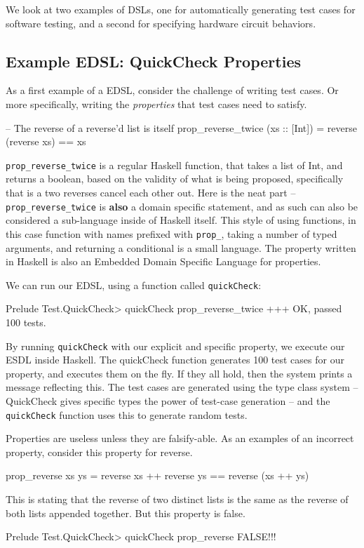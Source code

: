 \documentclass[11pt]{article}
\begin{document}
We look at two examples of DSLs, one for automatically generating test cases for software testing,
and a second for specifying hardware circuit behaviors.

\subsection{Example EDSL: QuickCheck Properties}

As a first example of a EDSL, consider the challenge of writing test cases.
Or more specifically, writing the {\em properties\/} that test cases need to satisfy.

\begin{Code}
-- The reverse of a reverse'd list is itself
prop_reverse_twice (xs :: [Int]) = reverse (reverse xs) == xs
\end{Code}

\verb|prop_reverse_twice| is a regular Haskell function,
that takes a list of Int, and returns a boolean, based
on the validity of what is being proposed, specifically
that is a two reverses cancel each other out. 
Here is the neat part -- \verb|prop_reverse_twice| is {\bf also\/} a
domain specific statement, and as such can also be considered
a sub-language inside of Haskell itself.  This style
of using functions, in this case function with names
prefixed with \verb|prop_|, taking a number of typed
arguments, and returning a conditional is a small language.
The property written in Haskell is also an Embedded Domain Specific
Language for properties.

We can run our EDSL, using a function called \verb|quickCheck|:
\begin{Code}
Prelude Test.QuickCheck> quickCheck prop_reverse_twice
+++ OK, passed 100 tests.
\end{Code}
By running \verb|quickCheck| with our explicit and specific property,
we execute our ESDL inside Haskell. The quickCheck function
generates 100 test cases for our property, and executes
them on the fly. If they all hold, then the system prints
a message reflecting this. The test cases are generated using
the type class system -- QuickCheck gives specific types the
power of test-case generation -- and the \verb|quickCheck| function
uses this to generate random tests.

Properties are useless unless they are falsify-able. As an examples
of an incorrect property, consider this property for reverse.
\begin{Code}
prop_reverse xs ys = reverse xs ++ reverse ys == reverse (xs ++ ys)
\end{Code}
This is stating that the reverse of two distinct lists
is the same as the reverse of both lists appended together.
But this property is false.
\begin{Code}
Prelude Test.QuickCheck> quickCheck prop_reverse 
FALSE!!!
\end{Code}
\end{document}
